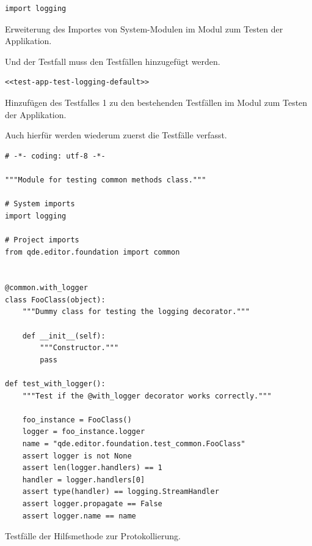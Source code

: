 \documentclass[10pt, openright, notitlepage]{scrreprt}
\begin{document}
\begin{listing}[H]
\begin{verbatim}
import logging
\end{verbatim}
\caption{\label{test-app-system-imports}
Erweiterung des Importes von System-Modulen im Modul zum Testen der Applikation.}
\end{listing}

Und der Testfall muss den Testfällen hinzugefügt werden.

\begin{listing}[H]
\begin{verbatim}
<<test-app-test-logging-default>>
\end{verbatim}
\caption{\label{test-app-test-cases}
Hinzufügen des Testfalles 1 zu den bestehenden Testfällen im Modul zum Testen der Applikation.}
\end{listing}

Auch hierfür werden wiederum zuerst die Testfälle verfasst.

\begin{listing}[H]
\begin{verbatim}
# -*- coding: utf-8 -*-

"""Module for testing common methods class."""

# System imports
import logging

# Project imports
from qde.editor.foundation import common


@common.with_logger
class FooClass(object):
    """Dummy class for testing the logging decorator."""

    def __init__(self):
        """Constructor."""
        pass

def test_with_logger():
    """Test if the @with_logger decorator works correctly."""

    foo_instance = FooClass()
    logger = foo_instance.logger
    name = "qde.editor.foundation.test_common.FooClass"
    assert logger is not None
    assert len(logger.handlers) == 1
    handler = logger.handlers[0]
    assert type(handler) == logging.StreamHandler
    assert logger.propagate == False
    assert logger.name == name
\end{verbatim}
\caption{\label{fig:editor-common-logging-test}
Testfälle der Hilfsmethode zur Protokollierung.}
\end{listing}
\end{document}
